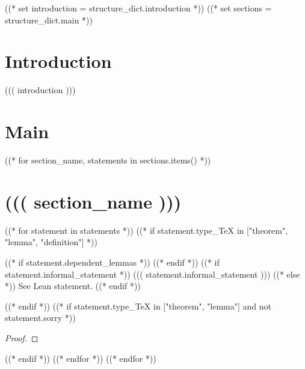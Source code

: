 
\tableofcontents
((* set introduction = structure_dict.introduction *))
((* set sections = structure_dict.main *))

\section{Introduction}
((( introduction )))

\section{Main}
((* for section_name, statements in sections.items() *))
\section{((( section_name )))}
((* for statement in statements *))
((* if statement.type_TeX in ["theorem", "lemma", "definition"] *))
\begin{((( statement.type_TeX )))}\label{((( statement.name )))}
    \leanok
    ((* if statement.dependent_lemmas *))
    ((* endif *))
    ((* if statement.informal_statement *))
        ((( statement.informal_statement )))
    ((* else *))
        See Lean statement.
    ((* endif *))
\end{((( statement.type_TeX )))}
((* endif *))
((* if statement.type_TeX in ["theorem", "lemma"] and not statement.sorry *))
\begin{proof}
    \leanok
\end{proof}
((* endif *))
((* endfor *))
((* endfor *))
